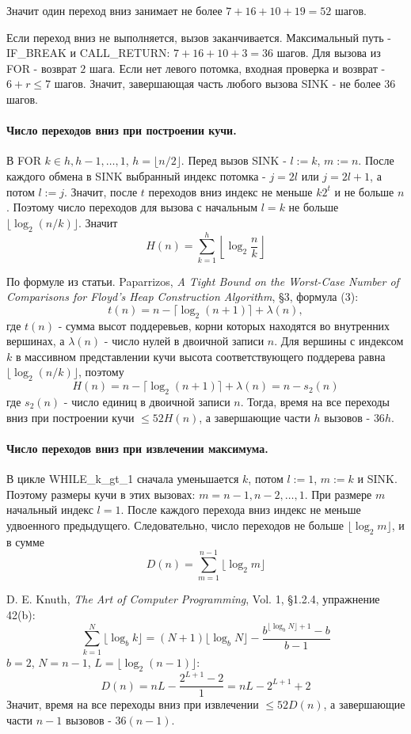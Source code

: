 \documentclass[12pt]{article}
\begin{document}
Значит один переход вниз занимает не более $7+16+10+19=52$ шагов.

Если переход вниз не выполняется, вызов заканчивается. Максимальный путь - IF\_BREAK и CALL\_RETURN: $7+16+10+3=36$ шагов. Для вызова из FOR - возврат $2$ шага. Если нет левого потомка, входная проверка и возврат - $6+r\leq7$ шагов. Значит, завершающая часть любого вызова SINK - не более $36$ шагов.

\paragraph{Число переходов вниз при построении кучи.}

В FOR $k\in h,h-1,\ldots,1$, $h=\lfloor n/2\rfloor$. Перед вызов SINK - $l:=k$, $m:=n$. После каждого обмена в SINK выбранный индекс потомка - $j=2l$ или $j=2l+1$, а потом $l:=j$. Значит, после $t$ переходов вниз индекс не меньше $k2^t$ и не больше $n$. Поэтому число переходов для вызова с начальным $l=k$ не больше $\lfloor\log_2(n/k)\rfloor$. Значит
\[
    H(n)=\sum_{k=1}^{h}\left\lfloor\log_2\frac{n}{k}\right\rfloor
\]

По формуле из статьи. Paparrizos, \textit{A Tight Bound on the Worst-Case Number of Comparisons for Floyd's Heap Construction Algorithm}, §3, формула (3):
\[
    t(n)=n-\lceil\log_2(n+1)\rceil+\lambda(n),
\]
где $t(n)$ - сумма высот поддеревьев, корни которых находятся во внутренних вершинах, а $\lambda(n)$ - число нулей в двоичной записи $n$. Для вершины с индексом $k$ в массивном представлении кучи высота соответствующего поддерева равна $\lfloor\log_2(n/k)\rfloor$, поэтому
\[
    H(n)=n-\lceil\log_2(n+1)\rceil+\lambda(n)=n-s_2(n)
\]
где $s_2(n)$ - число единиц в двоичной записи $n$. Тогда, время на все переходы вниз при построении кучи $\le 52H(n)$, а завершающие части $h$ вызовов - $36h$.

\paragraph{Число переходов вниз при извлечении максимума.}

В цикле WHILE\_k\_gt\_1 сначала уменьшается $k$, потом $l:=1$, $m:=k$ и SINK. Поэтому размеры кучи в этих вызовах: $m=n-1,n-2,\ldots,1$. При размере $m$ начальный индекс $l=1$. После каждого перехода вниз индекс не меньше удвоенного предыдущего. Следовательно, число переходов не больше $\lfloor\log_2 m\rfloor$, и в сумме
\[
    D(n)=\sum_{m=1}^{n-1}\lfloor\log_2 m\rfloor
\]

D. E. Knuth, \textit{The Art of Computer Programming}, Vol. 1, §1.2.4, упражнение 42(b):
\[
    \sum_{k=1}^{N}\lfloor\log_b k\rfloor
    =(N+1)\lfloor\log_b N\rfloor
    -\frac{b^{\lfloor\log_b N\rfloor+1}-b}{b-1}
\]
$b=2$, $N=n-1$, $L=\lfloor\log_2(n-1)\rfloor$:
\[
    D(n)=nL-\frac{2^{L+1}-2}{1}=nL-2^{L+1}+2
\]
Значит, время на все переходы вниз при извлечении $\le 52D(n)$, а завершающие части $n-1$ вызовов - $36(n-1)$.
\end{document}
